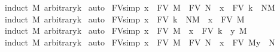 \begin{isabellebody}
%
\isadelimproof
%
\endisadelimproof
%
\isatagproof
{}\isamarkupfalse%
\ {\isacharparenleft}induct\ M\ arbitrary{\isacharcolon}k{\isacharparenright}\isanewline
{}\isamarkupfalse%
\ auto%
\endisatagproof
{\isafoldproof}%
%
\isadelimproof
\isanewline
%
\endisadelimproof
\isanewline
{}\isamarkupfalse%
\ FV{\isacharunderscore}simp{}{\isacharcolon}\ {\isachardoublequoteopen}x\ {\isasymnotin}\ FV\ M\ {\isasymunion}\ FV\ N\ {\isasymLongrightarrow}\ x\ {\isasymnotin}\ FV\ {\isacharbraceleft}k\ {\isasymrightarrow}\ N{\isacharbraceright}M{\isachardoublequoteclose}\isanewline
%
\isadelimproof
%
\endisadelimproof
%
\isatagproof
{}\isamarkupfalse%
\ {\isacharparenleft}induct\ M\ arbitrary{\isacharcolon}k{\isacharparenright}\isanewline
{}\isamarkupfalse%
\ auto%
\endisatagproof
{\isafoldproof}%
%
\isadelimproof
\isanewline
%
\endisadelimproof
\isanewline
{}\isamarkupfalse%
\ FV{\isacharunderscore}simp{}{\isacharcolon}\ {\isachardoublequoteopen}x\ {\isasymnotin}\ FV\ {\isacharbraceleft}k\ {\isasymrightarrow}\ N{\isacharbraceright}M\ {\isasymLongrightarrow}\ x\ {\isasymnotin}\ FV\ M{\isachardoublequoteclose}\isanewline
%
\isadelimproof
%
\endisadelimproof
%
\isatagproof
{}\isamarkupfalse%
\ {\isacharparenleft}induct\ M\ arbitrary{\isacharcolon}k{\isacharparenright}\isanewline
{}\isamarkupfalse%
\ auto%
\endisatagproof
{\isafoldproof}%
%
\isadelimproof
\isanewline
%
\endisadelimproof
\isanewline
{}\isamarkupfalse%
\ FV{\isacharunderscore}simp{}{\isacharcolon}\ {\isachardoublequoteopen}x\ {\isasymnotin}\ FV\ M\ {\isasymLongrightarrow}\ x\ {\isasymnotin}\ FV\ {\isacharbraceleft}k\ {\isacharless}{\isacharminus}\ y{\isacharbraceright}\ M{\isachardoublequoteclose}\isanewline
%
\isadelimproof
%
\endisadelimproof
%
\isatagproof
{}\isamarkupfalse%
\ {\isacharparenleft}induct\ M\ arbitrary{\isacharcolon}k{\isacharparenright}\isanewline
{}\isamarkupfalse%
\ auto%
\endisatagproof
{\isafoldproof}%
%
\isadelimproof
\isanewline
%
\endisadelimproof
\isanewline
{}\isamarkupfalse%
\ FV{\isacharunderscore}simp{}{\isacharcolon}\ {\isachardoublequoteopen}x\ {\isasymnotin}\ FV\ M\ {\isasymunion}\ FV\ N\ {\isasymLongrightarrow}\ x\ {\isasymnotin}\ FV\ {\isacharparenleft}M{\isacharbrackleft}y\ {\isacharcolon}{\isacharcolon}{\isacharequal}\ N{\isacharbrackright}{\isacharparenright}{\isachardoublequoteclose}\isanewline
%
\isadelimproof
%
\endisadelimproof
%
\isatagproof
{}\isamarkupfalse%

\end{isabellebody}
